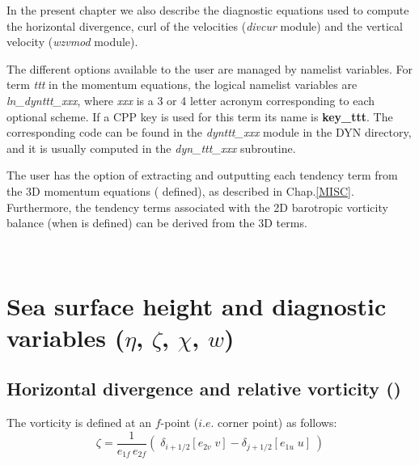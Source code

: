 In the present chapter we also describe the diagnostic equations used to compute 
the horizontal divergence, curl of the velocities (\emph{divcur} module) and 
the vertical velocity (\emph{wzvmod} module).

The different options available to the user are managed by namelist variables. 
For term \textit{ttt} in the momentum equations, the logical namelist variables are \textit{ln\_dynttt\_xxx}, 
where \textit{xxx} is a 3 or 4 letter acronym corresponding to each optional scheme. 
If a CPP key is used for this term its name is \textbf{key\_ttt}. The corresponding 
code can be found in the \textit{dynttt\_xxx} module in the DYN directory, and it is 
usually computed in the \textit{dyn\_ttt\_xxx} subroutine.

The user has the option of extracting and outputting each tendency term from the
3D momentum equations ( defined), as described in 
Chap.\ref{MISC}.  Furthermore, the tendency terms associated with the 2D 
barotropic vorticity balance (when  is defined) can be derived from the 
3D terms.

$\ $\newline    %

\section{Sea surface height and diagnostic variables ($\eta$, $\zeta$, $\chi$, $w$)}
\label{DYN_divcur_wzv}

\subsection   [Horizontal divergence and relative vorticity (\textit{divcur})]
			{Horizontal divergence and relative vorticity ()}
\label{DYN_divcur}

The vorticity is defined at an $f$-point ($i.e.$ corner point) as follows:
\begin{equation} \label{Eq_divcur_cur}
\zeta =\frac{1}{e_{1f}\,e_{2f} }\left( {\;\delta _{i+1/2} \left[ {e_{2v}\;v} \right]
						        -\delta _{j+1/2} \left[ {e_{1u}\;u} \right]\;} \right)
\end{equation} 

